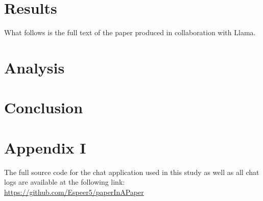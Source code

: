 \documentclass[11pt, a4paper, hyphens]{article}
\begin{document}
\section{Results}\label{sec:results}

What follows is the full text of the paper produced in collaboration with Llama.



\section{Analysis}\label{sec:analysis}

\section{Conclusion}\label{sec:conclusion}

\section{Appendix I}\label{sec:appendixI}

The full source code for the chat application used in this study as well as all
chat logs are available at the following link: 
\url{https://github.com/Espeer5/paperInAPaper}

% 
\end{document}
